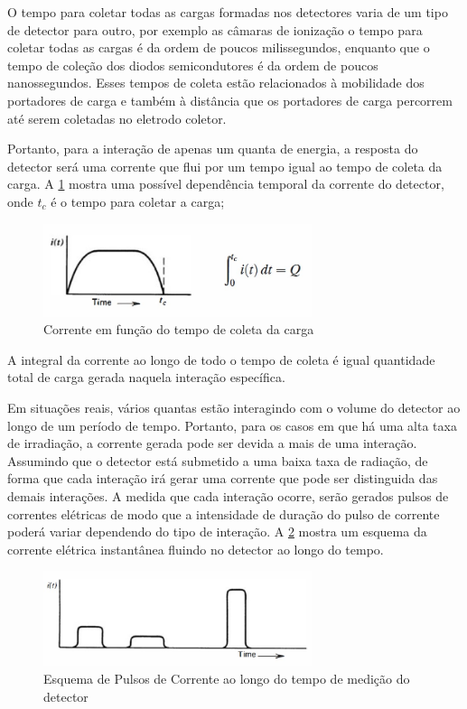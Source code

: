 \documentclass[11pt,a4paper]{article}
\newcounter{exemplo}
\begin{document}
    O tempo para coletar todas as cargas formadas nos detectores varia de um tipo de detector para outro, por exemplo as câmaras de ionização o tempo para coletar todas as cargas é da ordem de poucos milissegundos, enquanto que o tempo de coleção dos  diodos semicondutores é da ordem de poucos nanossegundos. Esses tempos de coleta estão relacionados à mobilidade dos portadores de carga e também à distância que os portadores de carga percorrem até serem coletadas no eletrodo coletor.

    Portanto, para a interação de apenas um quanta de energia, a resposta do detector será uma corrente que flui por um tempo igual ao tempo de coleta da carga. A  \ref{fig:esquemaTempoColetaCorrente} mostra uma possível dependência temporal da corrente do detector, onde $t_c$ é o tempo para coletar a carga;

        \begin{figure}[h]
            \centering
            \includegraphics[width=0.7\textwidth]{Imagens/esquemaTempoColetaCorrente.jpg}
            \caption{Corrente em função do tempo de coleta da carga}
            \label{fig:esquemaTempoColetaCorrente}
        \end{figure}

	\noindent A integral da corrente ao longo de todo o tempo de coleta é igual quantidade total de carga gerada naquela interação específica. 

	Em situações reais, vários quantas estão interagindo com o volume do detector ao longo de um período de tempo. Portanto, para os casos em que há uma alta taxa de irradiação, a corrente gerada pode ser devida a mais de uma interação.  Assumindo que o detector está submetido a uma baixa taxa de radiação, de forma que cada interação irá gerar uma corrente que pode ser distinguida das demais interações. A medida que cada interação ocorre, serão gerados pulsos de correntes elétricas de modo que a intensidade de duração do pulso de corrente poderá variar dependendo do tipo de interação. A  \ref{fig:esquemaCorrentePulsada} mostra um esquema da corrente elétrica instantânea fluindo no detector ao longo do tempo.

		\begin{figure}[h]
			\centering
			\includegraphics[width=0.7\textwidth]{Imagens/esquemaCorrentePulsada.jpg}
			\caption{Esquema de Pulsos de Corrente ao longo do tempo de medição do detector}
			\label{fig:esquemaCorrentePulsada}
		\end{figure}
\end{document}
